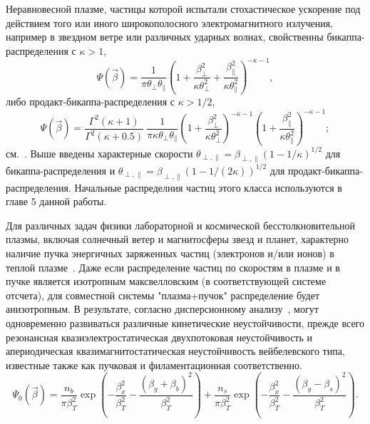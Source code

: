Неравновесной плазме, частицы которой испытали стохастическое ускорение под действием того или иного широкополосного электромагнитного излучения, например в звездном ветре или различных ударных волнах, свойственны бикаппа-распределения с $\kappa >  1$,  
\begin{equation}
\label{eq:kappa}
    \Psi(\vec{\beta})=\dfrac{1}{\pi\theta_{\perp}\theta_{\|} } \left(1+\dfrac{\beta_\perp^2}{\kappa\theta_{\perp}^2}+\dfrac{\beta_\|^2}{\kappa\theta_{\|}^2}\right)^{-\kappa-1} ,
\end{equation}
либо продакт-бикаппа-распределения с $\kappa > 1/2$, 
\begin{equation}
\label{productkappa}
\Psi(\vec{\beta}) = \dfrac{\Gamma^2(\kappa+1)}{\Gamma^2(\kappa+0.5)} \: \dfrac{1}{\pi\kappa\theta_{\perp}\theta_{\|}}\left(1+\dfrac{\beta_\perp^2}{\kappa\theta_{\perp}^2}\right)^{-\kappa-1} \!\left(1+\dfrac{\beta_\|^2}{\kappa\theta_{\|}^2}\right)^{-\kappa-1};
\end{equation}
см.~\cite{Lazar2010, Livadiotis2017, Livadiotis2021,Pierrard2010}. Выше введены характерные скорости $\theta_{\perp,\|}=\beta_{\perp,\|}\left(1-1/\kappa\right)^{1/2}$ для бикаппа-распределения и $\theta_{\perp,\|}=\beta_{\perp,\|}\left(1-1/(2\kappa)\right)^{1/2}$ для продакт-бикаппа-распределения. Начальные распределния частиц этого класса используются в главе 5 данной работы.

Для различных задач физики лабораторной и космической бесстолкновительной плазмы, включая солнечный ветер и магнитосферы звезд и планет, характерно наличие пучка энергичных заряженных частиц (электронов и/или ионов) в теплой плазме~\cite{Gary1993,Treumann1997,Marsch2006}. 
Даже если распределение частиц по скоростям в плазме и в пучке является изотропным максвелловским (в соответствующей системе отсчета), для совместной системы "плазма+пучок" распределение будет анизотропным.  
В результате, согласно дисперсионному анализу~\cite{Mikhailovsky1971,Fried1959,Krall1973,Tzoufras2006,Bret2010}, могут одновременно развиваться различные кинетические неустойчивости, прежде всего резонансная квазиэлектростатическая двухпотоковая неустойчивость и апериодическая квазимагнитостатическая неустойчивость вейбелевского типа, известные также как пучковая и филаментационная соответственно. 
\begin{equation}
\label{eq:bp}
    \Psi_0(\vec{\beta})=\dfrac{n_b}{\pi\beta_T^2} \exp\left(-\dfrac{\beta_x^2}{\beta_T^2}-\dfrac{\left(\beta_y+\beta_{b}\right)^2}{\beta_T^2}\right)+\dfrac{n_s}{\pi\beta_T^2 } \exp\left(-\dfrac{\beta_x^2}{\beta_T^2}-\dfrac{\left(\beta_y-\beta_{s}\right)^2}{\beta_T^2}\right).  
\end{equation}

